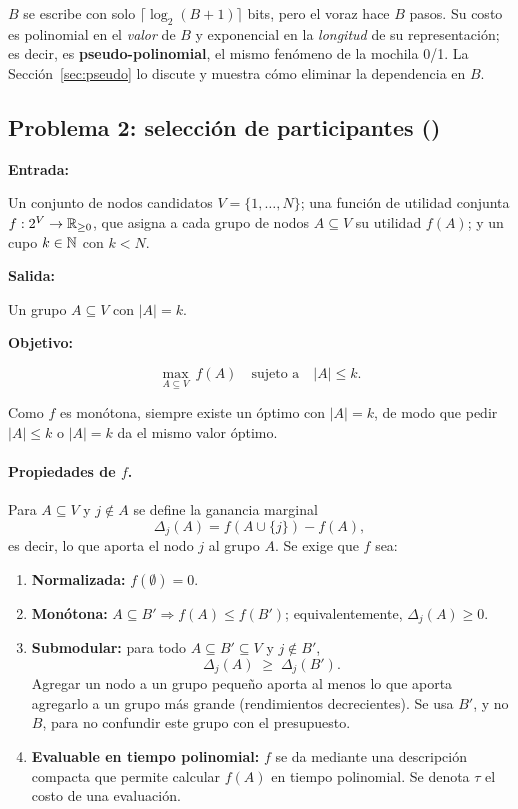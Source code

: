 \begin{observacion}
$B$ se escribe con solo $\lceil\log_2(B+1)\rceil$ bits, pero el voraz hace $B$ pasos. Su costo es polinomial en el \emph{valor} de $B$ y exponencial en la \emph{longitud} de su representación; es decir, es \textbf{pseudo-polinomial}, el mismo fenómeno de la mochila 0/1. La Sección~\ref{sec:pseudo} lo discute y muestra cómo eliminar la dependencia en $B$.
\end{observacion}
\subsection{Problema 2: selección de participantes (\SEL)}

\begin{definicion}\label{def:sel}

\textbf{Entrada:}

Un conjunto de nodos candidatos $V=\{1,\dots,N\}$; una función de utilidad conjunta
$f:2^{V}\to\mathbb{R}_{\ge 0}$, que asigna a cada grupo de nodos $A\subseteq V$
su utilidad $f(A)$; y un cupo $k\in\mathbb{N}$ con $k<N$.

\vspace{0.2cm}

\textbf{Salida:}

Un grupo $A\subseteq V$ con $|A|=k$.

\vspace{0.2cm}

\textbf{Objetivo:}

\[
\max_{A\subseteq V}\ f(A)
\quad\text{sujeto a}\quad |A|\le k.
\]

\end{definicion}
Como $f$ es monótona, siempre existe un óptimo con $|A|=k$, de modo que pedir $|A|\le k$ o $|A|=k$ da el mismo valor óptimo.

\paragraph{Propiedades de $f$.} Para $A\subseteq V$ y $j\notin A$ se define la ganancia marginal
\[
\Delta_j(A) = f(A\cup\{j\}) - f(A),
\]
es decir, lo que aporta el nodo $j$ al grupo $A$. Se exige que $f$ sea:
\begin{enumerate}
  \item \textbf{Normalizada:} $f(\emptyset)=0$.
  \item \textbf{Monótona:} $A\subseteq B' \Rightarrow f(A)\le f(B')$; equivalentemente, $\Delta_j(A)\ge 0$.
  \item \textbf{Submodular:} para todo $A\subseteq B'\subseteq V$ y $j\notin B'$,
  \[
  \Delta_j(A) \;\ge\; \Delta_j(B').
  \]
  Agregar un nodo a un grupo pequeño aporta al menos lo que aporta agregarlo a un grupo más grande (rendimientos decrecientes). Se usa $B'$, y no $B$, para no confundir este grupo con el presupuesto.
  \item \textbf{Evaluable en tiempo polinomial:} $f$ se da mediante una descripción compacta que permite calcular $f(A)$ en tiempo polinomial. Se denota $\tau$ el costo de una evaluación.
\end{enumerate}

